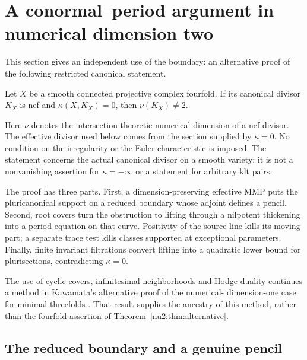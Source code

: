 \section{A conormal--period argument in numerical dimension two}
\label{nu2:sec:method}

This section gives an independent use of the boundary: an alternative
proof of the following restricted canonical statement.

\begin{theorem}\label{nu2:thm:alternative}
Let $X$ be a smooth connected projective complex fourfold.  If its
canonical divisor $K_X$ is nef and $\kappa(X,K_X)=0$, then
$\nu(K_X)\ne2$.
\end{theorem}

Here $\nu$ denotes the intersection-theoretic numerical dimension of a
nef divisor.  The effective divisor used below comes from the section
supplied by $\kappa=0$.  No condition on the irregularity or the Euler
characteristic is imposed.  The statement concerns the actual
canonical divisor on a smooth variety; it is not a nonvanishing
assertion for $\kappa=-\infty$ or a statement for arbitrary klt pairs.

The proof has three parts.  First, a dimension-preserving effective
MMP puts the pluricanonical support on a reduced boundary whose
adjoint defines a pencil.  Second, root covers turn the obstruction
to lifting through a nilpotent thickening into a period equation on
that curve.  Positivity of the source line kills its moving part;
a separate trace test kills classes supported at exceptional
parameters.  Finally, finite invariant filtrations convert lifting
into a quadratic lower bound for plurisections, contradicting
$\kappa=0$.

The use of cyclic covers, infinitesimal neighborhoods and Hodge duality
continues a method in Kawamata's alternative proof of the numerical-
dimension-one case for minimal threefolds
\cite[Section~4, Theorem~4.1 and Lemmas~4.2--4.3]{Kawamata1992}.
That result supplies the ancestry of this method, rather than the
fourfold assertion of Theorem~\ref{nu2:thm:alternative}.

\subsection{The reduced boundary and a genuine pencil}\label{nu2:subsec:reduction}


